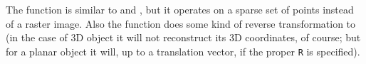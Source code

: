 The function is similar to  and , but it operates on a sparse set of points instead of a raster image. Also the function does some kind of reverse transformation to  (in the case of 3D object it will not reconstruct its 3D coordinates, of course; but for a planar object it will, up to a translation vector, if the proper \texttt{R} is specified).

\fi
